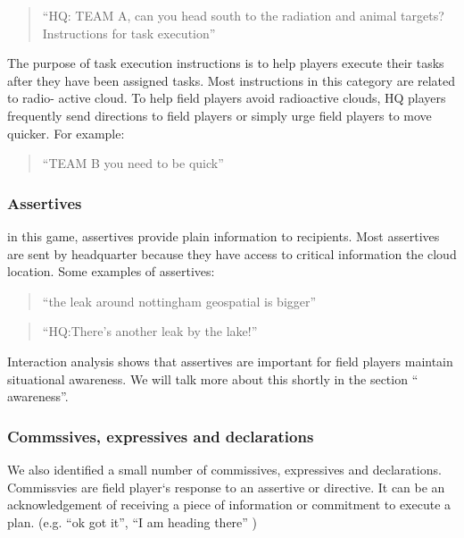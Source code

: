 \begin{quote}
``HQ: TEAM A, can you head south to the radiation and animal targets? Instructions for task execution''\\
\end{quote}

The purpose of task execution instructions is to help players execute their tasks after they have been assigned tasks. Most instructions in this category are related to radio- active cloud. To help field players avoid radioactive clouds, HQ players frequently send directions to field players or simply urge field players to move quicker. For example:

\begin{quote}
``TEAM B you need to be quick'' \\
\end{quote}

\subsubsection{Assertives}

in this game, assertives provide plain information to recipients. Most assertives are sent by headquarter because they have access to critical information the cloud location.
Some examples of assertives:

\begin{quote}
``the leak around nottingham geospatial is bigger''\\
\end{quote}

\begin{quote}
``HQ:There's another leak by the lake!''\\
\end{quote}

Interaction analysis shows that assertives are important for field players maintain situational awareness. We will talk more about this shortly in the section `` awareness''.

\subsubsection{Commssives, expressives and declarations}
We also identified a small number of commissives, expressives and declarations. Commissvies are field player`s response to an assertive or directive. It can be an acknowledgement of receiving a piece of information or commitment to execute a plan. (e.g. ``ok got it'', ``I am heading there'' )\\

